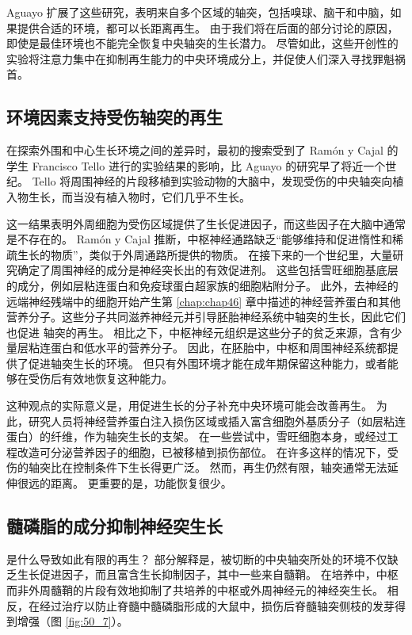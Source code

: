 Aguayo 扩展了这些研究，表明来自多个区域的轴突，包括嗅球、脑干和中脑，如果提供合适的环境，都可以长距离再生。 由于我们将在后面的部分讨论的原因，即使是最佳环境也不能完全恢复中央轴突的生长潜力。 尽管如此，这些开创性的实验将注意力集中在抑制再生能力的中央环境成分上，并促使人们深入寻找罪魁祸首。

\subsection{环境因素支持受伤轴突的再生}
在探索外围和中心生长环境之间的差异时，最初的搜索受到了 Ramón y Cajal 的学生 Francisco Tello 进行的实验结果的影响，比 Aguayo 的研究早了将近一个世纪。 Tello 将周围神经的片段移植到实验动物的大脑中，发现受伤的中央轴突向植入物生长，而当没有植入物时，它们几乎不生长。

这一结果表明外周细胞为受伤区域提供了生长促进因子，而这些因子在大脑中通常是不存在的。 Ramón y Cajal 推断，中枢神经通路缺乏“能够维持和促进惰性和稀疏生长的物质”，类似于外周通路所提供的物质。 在接下来的一个世纪里，大量研究确定了周围神经的成分是神经突长出的有效促进剂。 这些包括雪旺细胞基底层的成分，例如层粘连蛋白和免疫球蛋白超家族的细胞粘附分子。 此外，去神经的远端神经残端中的细胞开始产生第 \ref{chap:chap46} 章中描述的神经营养蛋白和其他营养分子。这些分子共同滋养神经元并引导胚胎神经系统中轴突的生长，因此它们也促进 轴突的再生。 相比之下，中枢神经元组织是这些分子的贫乏来源，含有少量层粘连蛋白和低水平的营养分子。 因此，在胚胎中，中枢和周围神经系统都提供了促进轴突生长的环境。 但只有外围环境才能在成年期保留这种能力，或者能够在受伤后有效地恢复这种能力。

这种观点的实际意义是，用促进生长的分子补充中央环境可能会改善再生。 为此，研究人员将神经营养蛋白注入损伤区域或插入富含细胞外基质分子（如层粘连蛋白）的纤维，作为轴突生长的支架。 在一些尝试中，雪旺细胞本身，或经过工程改造可分泌营养因子的细胞，已被移植到损伤部位。 在许多这样的情况下，受伤的轴突比在控制条件下生长得更广泛。 然而，再生仍然有限，轴突通常无法延伸很远的距离。 更重要的是，功能恢复很少。

\subsection{髓磷脂的成分抑制神经突生长}
是什么导致如此有限的再生？ 部分解释是，被切断的中央轴突所处的环境不仅缺乏生长促进因子，而且富含生长抑制因子，其中一些来自髓鞘。 在培养中，中枢而非外周髓鞘的片段有效地抑制了共培养的中枢或外周神经元的神经突生长。 
相反，在经过治疗以防止脊髓中髓磷脂形成的大鼠中，损伤后脊髓轴突侧枝的发芽得到增强（图 \ref{fig:50_7}）。

